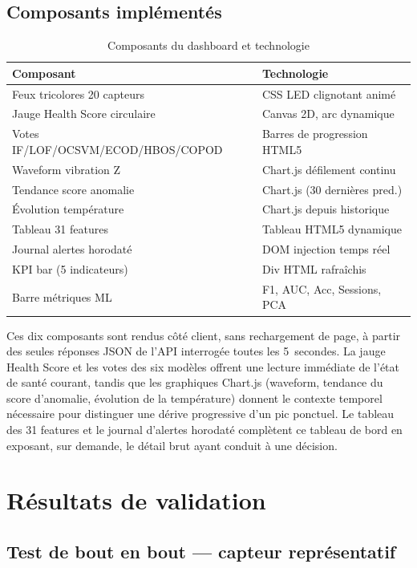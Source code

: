 \documentclass[12pt,a4paper]{report}
\begin{document}
\subsection{Composants implémentés}

\begin{table}[H]
\centering
\caption{Composants du dashboard et technologie}
\begin{tabular}{ll}
\toprule
\textbf{Composant} & \textbf{Technologie} \\
\midrule
Feux tricolores 20 capteurs    & CSS LED clignotant animé \\
Jauge Health Score circulaire  & Canvas 2D, arc dynamique \\
Votes IF/LOF/OCSVM/ECOD/HBOS/COPOD & Barres de progression HTML5 \\
Waveform vibration Z           & Chart.js défilement continu \\
Tendance score anomalie        & Chart.js (30 dernières pred.) \\
Évolution température          & Chart.js depuis historique \\
Tableau 31 features            & Tableau HTML5 dynamique \\
Journal alertes horodaté       & DOM injection temps réel \\
KPI bar (5 indicateurs)        & Div HTML rafraîchis \\
Barre métriques ML             & F1, AUC, Acc, Sessions, PCA \\
\bottomrule
\end{tabular}
\end{table}

Ces dix composants sont rendus côté client, sans rechargement de page, à partir des seules
réponses JSON de l'API interrogée toutes les 5~secondes. La jauge Health Score et les votes
des six modèles offrent une lecture immédiate de l'état de santé courant, tandis que les
graphiques Chart.js (waveform, tendance du score d'anomalie, évolution de la température)
donnent le contexte temporel nécessaire pour distinguer une dérive progressive d'un pic
ponctuel. Le tableau des 31 features et le journal d'alertes horodaté complètent ce
tableau de bord en exposant, sur demande, le détail brut ayant conduit à une décision.

\section{Résultats de validation}

\subsection{Test de bout en bout — capteur représentatif}
\end{document}

